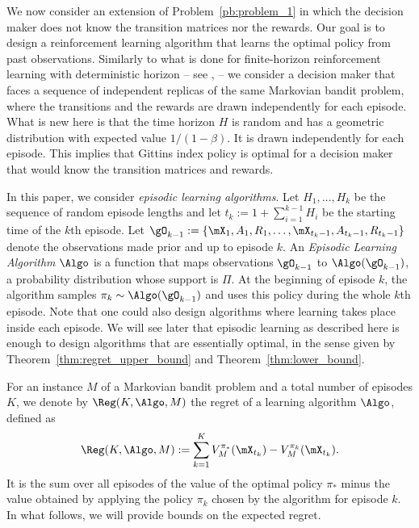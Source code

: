 We now consider an extension of Problem~\ref{pb:problem_1} in which the decision maker does not know the transition matrices
nor the rewards. Our goal is to design a reinforcement learning algorithm that
learns the optimal policy from past observations.  Similarly to what is done
for finite-horizon reinforcement learning with deterministic horizon -- see
\eg, \cite{zanette2019tighter,jin2018q,azar2017minimax,osband2013more} --
we consider a decision maker that faces a sequence of independent replicas of
the same Markovian bandit problem, where the transitions and the rewards 
are drawn independently for each episode.
What is new here is that  the time horizon $H$ is random and has a geometric distribution with expected value $1/(1-\beta)$. It is drawn  independently for each episode. This implies that Gittins index policy is optimal for a decision maker that would know the transition matrices and rewards.

In this paper, we consider \emph{episodic learning algorithms}. Let
$H_1,\ldots, H_k$ be the sequence of random episode lengths and let
$t_k:=1{+}\sum_{i=1}^{k-1}H_i$ be the starting time of the $k$th episode. Let 
\(\gO_{k-1}:=\{\mX_1,A_1,R_1,\dots,\mX_{t_k-1},A_{t_k-1},R_{t_k-1}\}\) denote
the observations made prior and up to episode \(k\). An \emph{Episodic Learning
Algorithm} \(\Algo\) is a function that maps observations \(\gO_{k-1}\) to
\(\Algo(\gO_{k-1})\), a probability distribution whose support is $\Pi$.  At the
beginning of episode $k$, the algorithm samples \(\pi_k\sim\Algo(\gO_{k-1})\)
and uses this policy during the whole $k$th episode. Note that one could also
design algorithms where learning takes place inside each episode. We will see
later that episodic learning as described here is enough to design algorithms
that are essentially optimal, in the sense given by Theorem~\ref{thm:regret_upper_bound} and Theorem~\ref{thm:lower_bound}.

For an  instance \(M\) of a Markovian bandit problem and a total number of
episodes $K$, we denote by $\Reg(K,\Algo,M)$ the regret of a
learning algorithm \(\Algo\), defined as
\begin{align}
  \Reg(K,\Algo,M) :=  \sum_{k=1}^K %
      V^{\pi_*}_M(\mX_{t_k}) - V^{\pi_k}_M(\mX_{t_k})%
      .\label{eq:regretTraj}
\end{align}
It is the sum over all episodes of the value of the optimal policy $\pi_*$ minus the value obtained by applying the policy $\pi_k$ chosen by the algorithm for episode $k$. In what follows, we will provide bounds on the expected regret.

